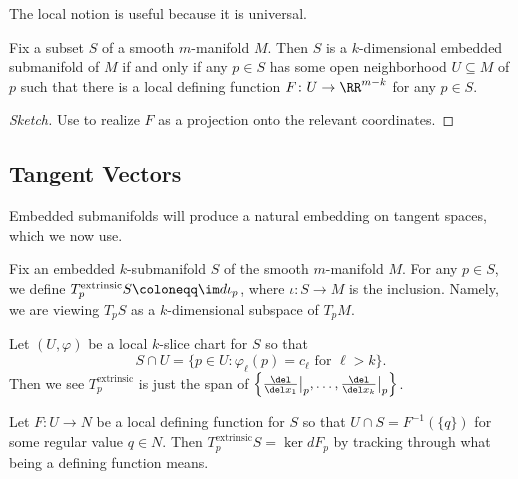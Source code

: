 \documentclass[../notes.tex]{subfiles}
\begin{document}
The local notion is useful because it is universal.
\begin{proposition}
	Fix a subset $S$ of a smooth $m$-manifold $M$. Then $S$ is a $k$-dimensional embedded submanifold of $M$ if and only if any $p\in S$ has some open neighborhood $U\subseteq M$ of $p$ such that there is a local defining function $F\colon U\to\RR^{m-k}$ for any $p\in S$.
\end{proposition}
\begin{proof}[Sketch]
	Use  to realize $F$ as a projection onto the relevant coordinates.
\end{proof}

\subsection{Tangent Vectors}
Embedded submanifolds will produce a natural embedding on tangent spaces, which we now use.
\begin{definition}
	Fix an embedded $k$-submanifold $S$ of the smooth $m$-manifold $M$. For any $p\in S$, we define $T_p^{\mathrm{extrinsic}}S\coloneqq\im d\iota_p$, where $\iota\colon S\to M$ is the inclusion. Namely, we are viewing $T_pS$ as a $k$-dimensional subspace of $T_pM$.
\end{definition}
\begin{example}
	Let $(U,\varphi)$ be a local $k$-slice chart for $S$ so that
	\[S\cap U=\{p\in U:\varphi_\ell(p)=c_\ell\text{ for }\ell>k\}.\]
	Then we see $T_p^{\mathrm{extrinsic}}$ is just the span of $\left\{\frac{\del}{\del x_1}\big|_p,\ldots,\frac{\del}{\del x_k}\big|_p\right\}$.
\end{example}
\begin{example}
	Let $F\colon U\to N$ be a local defining function for $S$ so that $U\cap S=F^{-1}(\{q\})$ for some regular value $q\in N$. Then $T_p^{\mathrm{extrinsic}}S=\ker dF_p$ by tracking through what being a defining function means.
\end{example}
\end{document}

